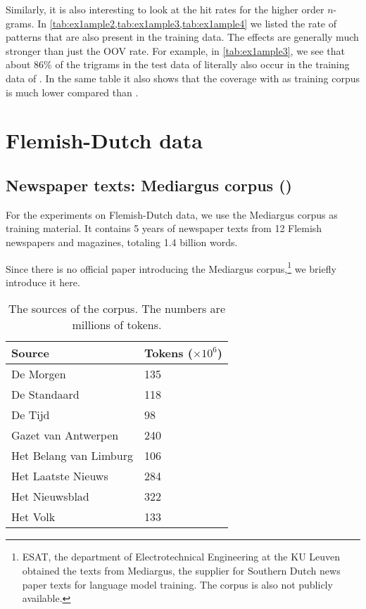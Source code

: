Similarly, it is also interesting to look at the hit rates for the higher order $n$-grams. In \cref{tab:ex1ample2,tab:ex1ample3,tab:ex1ample4} we listed the rate of patterns that are also present in the training data. The effects are generally much stronger than just the OOV rate. For example, in \cref{tab:ex1ample3}, we see that about 86\% of the trigrams in the test data of \obw literally also occur in the training data of \obw.
In the same table it also shows that the coverage with \emea as training corpus is much lower compared than \obw.
    
\section{Flemish-Dutch data}
\subsection{Newspaper texts: Mediargus corpus (\mediargus)}
For the experiments on Flemish-Dutch data, we use the Mediargus corpus as training material. It contains 5 years of newspaper texts from 12 Flemish newspapers and magazines, totaling 1.4 billion words.

Since there is no official paper introducing the Mediargus corpus,\footnote{ESAT, the department of Electrotechnical Engineering at the KU Leuven obtained the texts from Mediargus, the supplier for Southern Dutch news paper texts for language model training. The corpus is also not publicly available.} we briefly introduce it here.

\begin{table}
	\begin{tabular}{ll}
    	Source & \thead{Tokens \\ ($\times 10^6$)} \\ \hline
    	De Morgen & 135 \\
        De Standaard & 118 \\
        De Tijd & 98 \\
        Gazet van Antwerpen & 240 \\
        Het Belang van Limburg & 106 \\
        Het Laatste Nieuws & 284 \\
        Het Nieuwsblad & 322 \\
        Het Volk & 133
    \end{tabular}
    \caption{The sources of the \mediargus corpus. The numbers are millions of tokens.}
\end{table}


